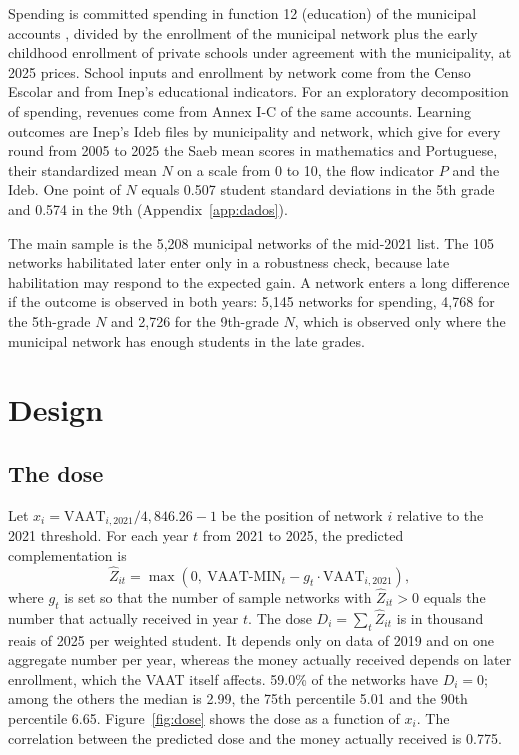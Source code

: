 \documentclass[11pt]{article}
\begin{document}
Spending is committed spending in function 12 (education) of the municipal accounts \citep[Siconfi, DCA, Annex I-E; definition of][]{cunha2026a}, divided by the enrollment of the municipal network plus the early childhood enrollment of private schools under agreement with the municipality, at 2025 prices. School inputs and enrollment by network come from the Censo Escolar and from Inep's educational indicators. For an exploratory decomposition of spending, revenues come from Annex I-C of the same accounts. Learning outcomes are Inep's Ideb files by municipality and network, which give for every round from 2005 to 2025 the Saeb mean scores in mathematics and Portuguese, their standardized mean $N$ on a scale from 0 to 10, the flow indicator $P$ and the Ideb. One point of $N$ equals 0.507 student standard deviations in the 5th grade and 0.574 in the 9th (Appendix~\ref{app:dados}).

The main sample is the 5,208 municipal networks of the mid-2021 list. The 105 networks habilitated later enter only in a robustness check, because late habilitation may respond to the expected gain. A network enters a long difference if the outcome is observed in both years: 5,145 networks for spending, 4,768 for the 5th-grade $N$ and 2,726 for the 9th-grade $N$, which is observed only where the municipal network has enough students in the late grades.

\section{Design}\label{sec:desenho}

\subsection{The dose}

Let $x_i = \text{VAAT}_{i,2021}/4{,}846.26 - 1$ be the position of network $i$ relative to the 2021 threshold. For each year $t$ from 2021 to 2025, the predicted complementation is
\begin{equation}
\hat Z_{it} = \max\left(0,\ \text{VAAT-MIN}_t - g_t \cdot \text{VAAT}_{i,2021}\right),
\end{equation}
where $g_t$ is set so that the number of sample networks with $\hat Z_{it}>0$ equals the number that actually received in year $t$. The dose $D_i = \sum_t \hat Z_{it}$ is in thousand reais of 2025 per weighted student. It depends only on data of 2019 and on one aggregate number per year, whereas the money actually received depends on later enrollment, which the VAAT itself affects. 59.0\% of the networks have $D_i=0$; among the others the median is 2.99, the 75th percentile 5.01 and the 90th percentile 6.65. Figure~\ref{fig:dose} shows the dose as a function of $x_i$. The correlation between the predicted dose and the money actually received is 0.775.
\end{document}
